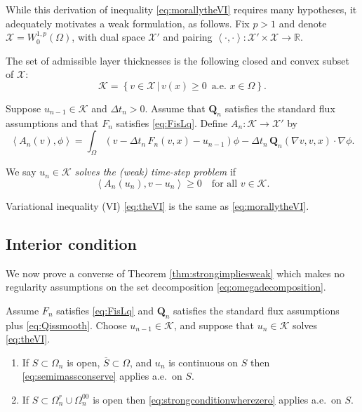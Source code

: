 \documentclass[final,onefignum]{siamart190516}
\newcommand\bQ{\mathbf{Q}}
\newcommand{\grad}{\nabla}
\newcommand{\ip}[2]{\ensuremath{\left<#1,#2\right>}}
\newcommand\RR{\mathbb{R}}
\begin{document}
While this derivation of inequality \eqref{eq:morallytheVI} requires many hypotheses, it adequately motivates a weak formulation, as follows.  Fix $p>1$ and denote $\mathcal{X} = W_0^{1,p}(\Omega)$, with dual space $\mathcal{X}'$ and pairing $\ip{\cdot}{\cdot}: \mathcal{X}' \times \mathcal{X} \to \RR$.

\begin{definition}  The set of admissible layer thicknesses is the following closed and convex subset of $\mathcal{X}$:
\begin{equation}
\mathcal{K} = \left\{v \in \mathcal{X} \,\big|\, v(x) \ge 0\, \text{ a.e.~} x \in \Omega\right\}.  \label{eq:defineK}
\end{equation}
\end{definition}

\begin{definition}  Suppose $u_{n-1}\in\mathcal{K}$ and $\Delta t_n>0$.  Assume that $\bQ_n$ satisfies the standard flux assumptions and that $F_n$ satisfies \eqref{eq:FisLq}.  Define $A_n:\mathcal{K} \to \mathcal{X}'$ by
\begin{equation}
  \ip{A_n(v)}{\phi} = \int_\Omega \left(v - \Delta t_n\, F_n(v,x) - u_{n-1}\right)\phi - \Delta t_n\, \bQ_n(\grad v,v,x) \cdot \grad\phi. \label{eq:defineAn}
\end{equation}
\end{definition}

\begin{definition}  We say $u_n\in\mathcal{K}$ \emph{solves the (weak) time-step problem} if
\begin{equation}
  \ip{A_n(u_n)}{v-u_n} \ge 0 \quad \text{for all } v \in \mathcal{K}.  \label{eq:theVI}
\end{equation}
\end{definition}

Variational inequality (VI) \eqref{eq:theVI} is the same as \eqref{eq:morallytheVI}.

\subsection{Interior condition}  \label{subsec:interior}  We now prove a converse of Theorem \ref{thm:strongimpliesweak} which makes no regularity assumptions on the set decomposition \eqref{eq:omegadecomposition}.

\begin{theorem} \label{thm:weakimpliesstrong}  Assume $F_n$ satisfies \eqref{eq:FisLq} and $\bQ_n$ satisfies the standard flux assumptions plus \eqref{eq:Qissmooth}.  Choose $u_{n-1}\in\mathcal{K}$, and suppose that $u_n\in\mathcal{K}$ solves \eqref{eq:theVI}.
\renewcommand{\labelenumi}{(\roman{enumi})}
\begin{enumerate}
\item If $S \subset \Omega_n$ is open, $\overline{S}\subset \Omega$, and $u_n$ is continuous on $S$ then \eqref{eq:semimassconserve} applies a.e.~on $S$.
\item If $S \subset \Omega_n^r \cup \Omega_n^{00}$ is open then \eqref{eq:strongconditionwherezero} applies a.e.~on $S$.
\end{enumerate}
\end{theorem}
\end{document}
